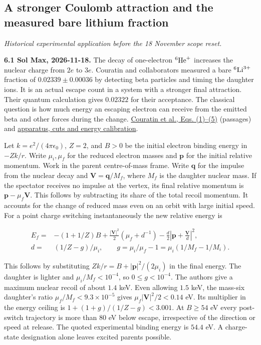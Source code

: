 \documentclass[11pt,a4paper]{article}
\begin{document}
\subsection{A stronger Coulomb attraction and the measured bare lithium
fraction}\label{a-stronger-coulomb-attraction-and-the-measured-bare-lithium-fraction}

\emph{Historical experimental application before the 18 November scope
reset.}

\textbf{6.1 Sol Max, 2026-11-18.} The decay of one-electron
\(^{6}{\rm He}^{+}\) increases the nuclear charge from \(2e\) to \(3e\).
Couratin and collaborators measured a bare \(^{6}{\rm Li}^{3+}\)
fraction of \(0.02339\pm0.00036\) by detecting beta particles and timing
the daughter ions. It is an actual escape count in a system with a
stronger final attraction. Their quantum calculation gives \(0.02322\)
for their acceptance. The classical question is how much energy an
escaping electron can receive from the emitted beta and other forces
during the change.
\href{https://in2p3.hal.science/in2p3-00709325v1/document\#page=4}{Couratin
et al., Eqs. (1)--(5)} (passages) and
\href{../docs/CouratinEtAl_Helium6_ChargeReadout.md}{apparatus, cuts and
energy calibration}.

Let \(k=e^2/(4\pi\epsilon_0)\), \(Z=2\), and \(B>0\) be the initial
electron binding energy in \(-Zk/r\). Write \(\mu_i,\mu_f\) for the
reduced electron masses and \(\boldsymbol p\) for the initial relative
momentum. Work in the parent centre-of-mass frame. Write
\(\boldsymbol q\) for the impulse from the nuclear decay and
\(\boldsymbol V=\boldsymbol q/M_f\), where \(M_f\) is the daughter
nuclear mass. If the spectator receives no impulse at the vertex, its
final relative momentum is \(\boldsymbol p-\mu_f\boldsymbol V\). This
follows by subtracting its share of the total recoil momentum. It
accounts for the change of reduced mass even on an orbit with large
initial speed. For a point charge switching instantaneously the new
relative energy is

\[
 \begin{aligned}
 E_f={}&-(1+1/Z)B+\frac{|\boldsymbol V|^2}{2}(\mu_f+d^{-1})
           -\frac d2\left|\boldsymbol p+\frac{\boldsymbol V}{d}\right|^2,\\
 d={}&(1/Z-g)/\mu_i,\qquad
 g=\mu_i/\mu_f-1=\mu_i(1/M_f-1/M_i).
 \end{aligned}
\]

This follows by substituting \(Zk/r=B+|\boldsymbol p|^2/(2\mu_i)\) in
the final energy. The daughter is lighter and \(\mu_i/M_f<10^{-4}\), so
\(0\le g<10^{-4}\). The authors give a maximum nuclear recoil of about
\(1.4\) keV. Even allowing \(1.5\) keV, the mass-six daughter's ratio
\(\mu_f/M_f<9.3\times10^{-5}\) gives \(\mu_f|\boldsymbol V|^2/2<0.14\)
eV. Its multiplier in the energy ceiling is \(1+(1+g)/(1/Z-g)<3.001\).
At \(B\ge54\) eV every post-switch trajectory is more than \(80\) eV
below escape, irrespective of the direction or speed at release. The
quoted experimental binding energy is \(54.4\) eV. A charge-state
designation alone leaves excited parents possible.
\end{document}
